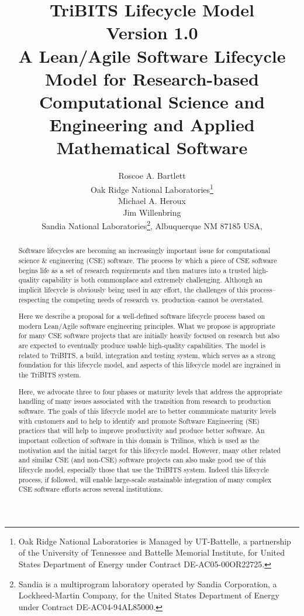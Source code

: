 \documentclass[11pt]{SANDreport}
\title{\center
TriBITS Lifecycle Model \\[2ex] Version 1.0 \\[2ex] \large A
Lean/Agile Software Lifecycle Model for Research-based Computational
Science and Engineering and Applied Mathematical Software }
\author{
Roscoe A. Bartlett \\ Oak Ridge National Laboratories\footnote{Oak
Ridge National Laboratories is Managed by UT-Battelle, a partnership
of the University of Tennessee and Battelle Memorial Institute, for
United States Department of Energy under Contract DE-AC05-00OR22725.} 
\\[2ex] Michael A. Heroux \\ Jim Willenbring \\ Sandia
National Laboratories\footnote{Sandia is a multiprogram laboratory
operated by Sandia Corporation, a Lockheed-Martin Company, for the
United States Department of Energy under Contract DE-AC04-94AL85000.},
Albuquerque NM 87185 USA, \\ }
\date{}
\begin{document}

\maketitle

%

%
\begin{abstract}
%

Software lifecycles are becoming an increasingly important issue for
computational science \& engineering (CSE) software.  The process 
by which a piece of CSE software begins life as a set of research requirements
and then matures into a trusted
high-quality capability is both commonplace and extremely challenging.  Although
an implicit lifecycle is obviously being used in any effort, the challenges of this 
process--respecting the competing needs of research vs. production--cannot
be overstated.

Here we describe a proposal for a well-defined software lifecycle
process based on modern Lean/Agile software engineering principles.
What we propose is appropriate for many CSE software projects that are initially
heavily focused on research but also are expected to eventually
produce usable high-quality capabilities.  The model is related to 
 TriBITS, a build, integration and testing system, which serves as a
strong foundation for this lifecycle model, and aspects of this
lifecycle model are ingrained in the TriBITS system.  

Here, we advocate three to four phases or maturity levels  that address the
appropriate handling of many issues associated with the
transition from research to production software.  The goals of this lifecycle
model are to better communicate maturity levels with customers and to
help to identify and promote Software Engineering (SE) practices that will help to improve
productivity and produce better software.  An important collection of
software in this domain is Trilinos, which is used as the motivation
and the initial target for this lifecycle model.  However, many other
related and similar CSE (and non-CSE) software projects can also
make good use of this lifecycle model, especially those that use the
TriBITS system.  Indeed this lifecycle process, if followed, will
enable large-scale sustainable integration of many
complex CSE software efforts across several institutions.

%
\end{abstract}
%
\end{document}
